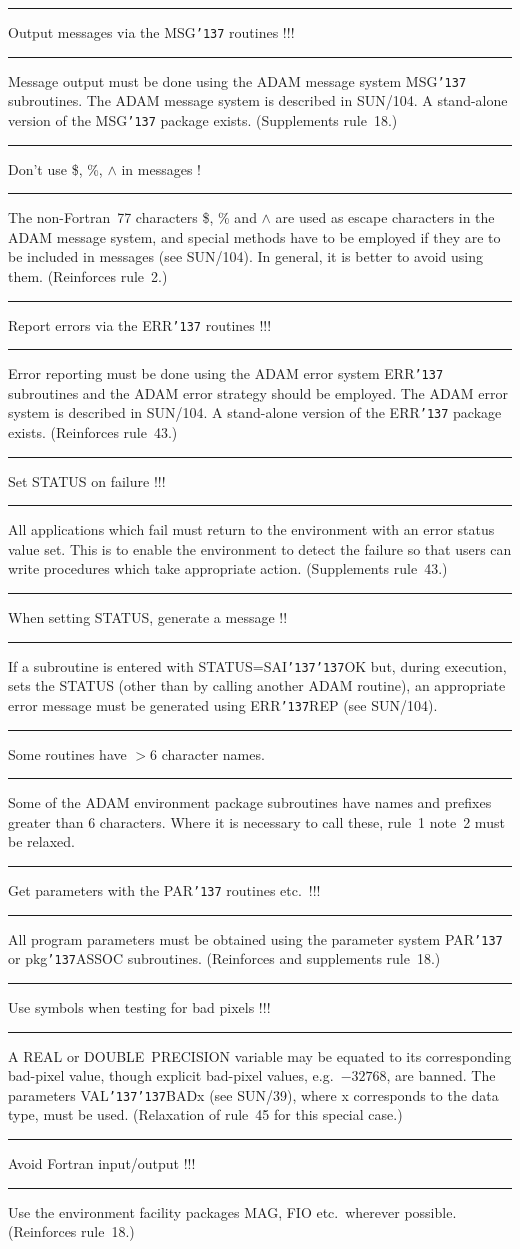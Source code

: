 \documentclass[twoside,11pt]{article}
\newcounter{sruleno}
\newcommand{\srule}[1]{
    \addtocounter{sruleno}{1}
    \goodbreak
    \rule[0.5ex]{\textwidth}{0.3mm}
    {\Large #1 \hfill {\thesruleno}}
    \rule[0.5ex]{\textwidth}{0.1mm}
}
\newcommand{\srule}[1]{
       \addtocounter{sruleno}{1}
       \begin{rawhtml} <HR> \end{rawhtml}
       {\Large \thesruleno}~~~~{\Large #1}
       \begin{rawhtml} <HR> \end{rawhtml}
       \end{tabular}
  }
\renewcommand{\_}{{\tt\char'137}}
\begin{document}
\srule{Output messages via the MSG\_ routines !!!}
Message output must be done using the ADAM message system MSG\_ subroutines.
The ADAM message system is described in SUN/104.  A stand-alone
version of the MSG\_ package exists.
(Supplements rule~18.)

\srule{Don't use \$, \%, $\wedge$ in messages !}
The non-Fortran~77 characters \$, \% and $\wedge$ are
used as escape characters in the ADAM message system, and
special methods have to be employed if they are to be included
in messages (see SUN/104).  In general, it is better to
avoid using them.
(Reinforces rule~2.)

\srule{Report errors via the ERR\_ routines !!!}
Error reporting must be done using the ADAM error system ERR\_ subroutines
and the ADAM error strategy should be employed. 
The ADAM error system is described in SUN/104.   A stand-alone
version of the ERR\_ package exists.
(Reinforces rule~43.)

\srule{Set STATUS on failure !!!}
All applications which fail must return to the
environment with an error status value set. 
This is to enable the environment to detect the failure so that users can
write procedures which take appropriate action.
(Supplements rule~43.)

\srule{When setting STATUS, generate a message !!}
If a subroutine is entered with STATUS=SAI\_\_OK
but, during execution,
sets the STATUS (other than by calling another ADAM routine),
an appropriate error message must be generated using ERR\_REP
(see SUN/104).

\srule{Some routines have $>6$ character names.}
Some of the ADAM environment package subroutines have names and prefixes
greater than 6 characters.
Where it is necessary to call these, rule~1 note~2 must be relaxed.

\srule{Get parameters with the PAR\_ routines etc.\ !!!}
All program parameters must be obtained using the parameter system PAR\_
or pkg\_ASSOC subroutines. 
(Reinforces and supplements rule~18.)

\srule{Use symbols when testing for bad pixels !!!}
A REAL or DOUBLE~PRECISION variable may be equated to its corresponding
bad-pixel value, though explicit bad-pixel values, e.g.\ $-32768$, are banned.
The parameters VAL\_\_BADx
(see SUN/39), where x corresponds to the data type, must be
used.
(Relaxation of rule~45 for this special case.)

\srule{Avoid Fortran input/output !!!}
Use the environment facility packages MAG, FIO etc.\ wherever possible.
(Reinforces rule~18.)
\end{document}
